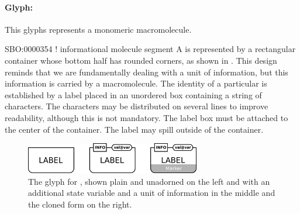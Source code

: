 \paragraph{Glyph: }

This glyphs represents a monomeric macromolecule.

\begin{glyphDescription}
\glyphSboTerm SBO:0000354 !  informational molecule segment
\glyphContainer A  is represented by a rectangular container whose bottom half has rounded corners, as shown in . This design reminds that we are fundamentally dealing with a unit of information, but this information is carried by a macromolecule.
\glyphLabel The identity of a particular  is established by a label placed in an unordered box containing a string of characters.  The characters may be distributed on several lines to improve readability, although this is not mandatory.  The label box must be attached to the center of the container.  The label may spill outside of the container.



\end{glyphDescription}


\begin{figure}[H]
  \centering
  \includegraphics[width = 3in]{images/genetic}
  \caption{The \PD glyph for , shown plain and
    unadorned on the left and with an additional state variable and a
    unit of information in the middle and the cloned form on the right.} 
  \label{fig:genetic}
\end{figure}

